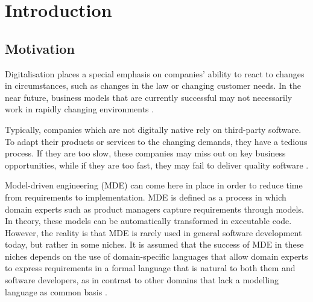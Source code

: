 
\chapter{Introduction} %

\label{Introduction} %


\newcommand{\keyword}[1]{\textbf{#1}}
\newcommand{\tabhead}[1]{\textbf{#1}}
\newcommand{\code}[1]{\texttt{#1}}
\newcommand{\file}[1]{\texttt{\bfseries#1}}
\newcommand{\option}[1]{\texttt{\itshape#1}}


\section{Motivation}
Digitalisation places a special emphasis on companies' ability to react to changes in circumstances, such as changes in the law or changing customer needs. In the near future, business models that are currently successful may not necessarily work in rapidly changing environments \cite{BBA}.

Typically, companies which are not digitally native rely on third-party software. To adapt their products or services to the changing demands, they have a tedious process. If they are too slow, these companies may miss out on key business opportunities, while if they are too fast, they may fail to deliver quality software \cite{BBA}.

Model-driven engineering (MDE) can come here in place in order to reduce time from requirements to implementation. MDE is defined as a process in which domain experts such as product managers capture requirements through models. In theory, these models can be automatically transformed in executable code. However, the reality is that MDE is rarely used in general software development today, but rather in some niches. It is assumed that the success of MDE in these niches depends on the use of domain-specific languages that allow domain experts to express requirements in a formal language that is natural to both them and software developers, as in contrast to other domains that lack a modelling language as common basis \cite{BBA}.

